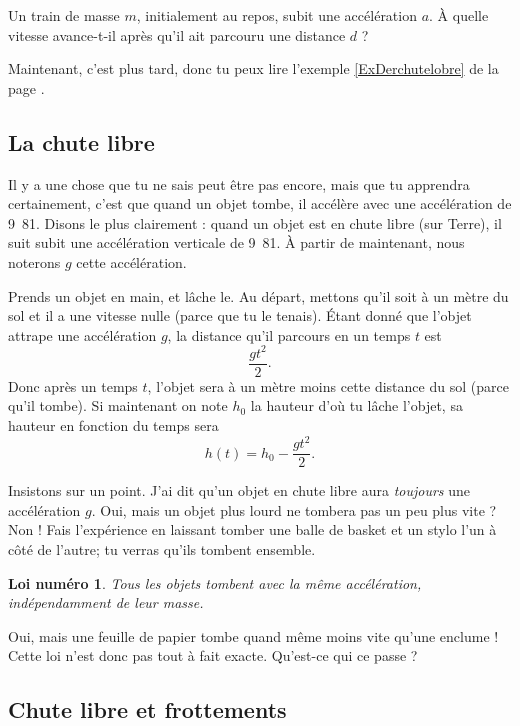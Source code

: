 \documentclass[a4paper,12pt]{book}
\newcounter{numloiphyz}
\theoremstyle{mes_exemples}	\newtheorem{exemple}[numtho]{Exemple}
\theoremstyle{mes_tho}
\newtheorem{loiphyz}[numloiphyz]{Loi numéro}
\begin{document}
\begin{exercice}		\label{ExoTrainAccDistance}
	Un train de masse $m$, initialement au repos, subit une accélération $a$. À quelle vitesse avance-t-il après qu'il ait parcouru une distance $d$ ?
\end{exercice}

Maintenant, c'est plus tard, donc tu peux lire l'exemple \ref{ExDerchutelobre} de la page \pageref{ExDerchutelobre}.

\subsection{La chute libre}

Il y a une chose que tu ne sais peut être pas encore, mais que tu apprendra certainement, c'est que quand un objet tombe, il accélère avec une accélération de \unit{9.81}{\meter\per\square\second}. Disons le plus clairement : quand un objet est en chute libre (sur Terre), il suit subit une accélération verticale de \unit{9.81}{\meter\per\square\second}. À partir de maintenant, nous noterons $g$ cette accélération.

Prends un objet en main, et lâche le. Au départ, mettons qu'il soit à un mètre du sol et il a une vitesse nulle (parce que tu le tenais). Étant donné que l'objet attrape une accélération $g$, la distance qu'il parcours en un temps $t$ est 
\[ 
  \frac{ gt^2 }{ 2 }.
\]
Donc après un temps $t$, l'objet sera à un mètre moins cette distance du sol (parce qu'il tombe). Si maintenant on note $h_0$ la hauteur d'où tu lâche l'objet, sa hauteur en fonction du temps sera
\[ 
  h(t)=h_0-\frac{ gt^2 }{ 2 }.
\]

Insistons sur un point. J'ai dit qu'un objet en chute libre aura \emph{toujours} une accélération $g$. Oui, mais un objet plus lourd ne tombera pas un peu plus vite ? Non ! Fais l'expérience en laissant tomber une balle de basket et un stylo l'un à côté de l'autre; tu verras qu'ils tombent ensemble.
\begin{loiphyz}
Tous les objets tombent avec la même accélération, indépendamment de leur masse.
\end{loiphyz}
Oui, mais une feuille de papier tombe quand même moins vite qu'une enclume ! Cette loi n'est donc pas tout à fait exacte. Qu'est-ce qui ce passe ?

\subsection{Chute libre et frottements}
\end{document}
